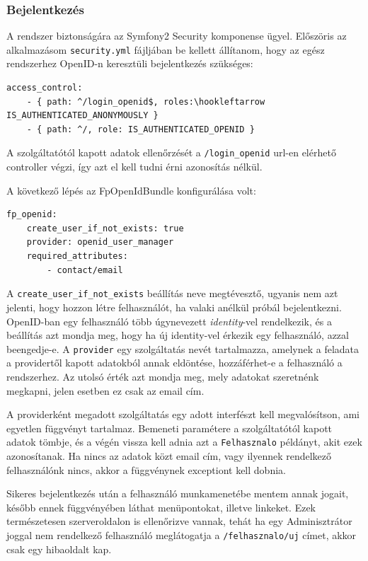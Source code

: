 \documentclass[a4paper,12pt,oneside]{report}
\begin{document}
\subsubsection*{Bejelentkezés}

A rendszer biztonságára az Symfony2 Security komponense ügyel. Előszöris az alkalmazásom {\tt security.yml} fájljában be kellett állítanom, hogy az egész rendszerhez OpenID-n keresztüli bejelentkezés szükséges:

\begin{lstlisting}
access_control:
    - { path: ^/login_openid$, roles:\hookleftarrow IS_AUTHENTICATED_ANONYMOUSLY }
    - { path: ^/, role: IS_AUTHENTICATED_OPENID }
\end{lstlisting}

A szolgáltatótól kapott adatok ellenőrzését a {\tt /login\_openid} url-en elérhető controller végzi, így azt el kell tudni érni azonosítás nélkül.

A következő lépés az FpOpenIdBundle konfigurálása volt:

\begin{lstlisting}
fp_openid:
    create_user_if_not_exists: true
    provider: openid_user_manager
    required_attributes:
        - contact/email
\end{lstlisting}

A {\tt create\_user\_if\_not\_exists} beállítás neve megtévesztő, ugyanis nem azt jelenti, hogy hozzon létre felhasználót, ha valaki anélkül próbál bejelentkezni. OpenID-ban egy felhasználó több úgynevezett {\em identity}-vel rendelkezik, és a beállítás azt mondja meg, hogy ha új identity-vel érkezik egy felhasználó, azzal beengedje-e. A {\tt provider} egy szolgáltatás nevét tartalmazza, amelynek a feladata a providertől kapott adatokból annak eldöntése, hozzáférhet-e a felhasználó a rendszerhez. Az utolsó érték azt mondja meg, mely adatokat szeretnénk megkapni, jelen esetben ez csak az email cím.

A providerként megadott szolgáltatás egy adott interfészt kell megvalósítson, ami egyetlen függvényt tartalmaz. Bemeneti paramétere a szolgáltatótól kapott adatok tömbje, és a végén vissza kell adnia azt a {\tt Felhasznalo} példányt, akit ezek azonosítanak. Ha nincs az adatok közt email cím, vagy ilyennek rendelkező felhasználónk nincs, akkor a függvénynek exceptiont kell dobnia.


Sikeres bejelentkezés után a felhasználó munkamenetébe mentem annak jogait, később ennek függvényében láthat menüpontokat, illetve linkeket. Ezek természetesen szerveroldalon is ellenőrizve vannak, tehát ha egy Adminisztrátor joggal nem rendelkező felhasználó meglátogatja a {\tt /felhasznalo/uj} címet, akkor csak egy hibaoldalt kap.
\end{document}
